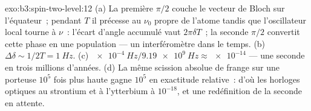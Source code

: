 \begin{solution}{exo:b3:spin-two-level:12}
(a) La première $\pi/2$ couche le vecteur de Bloch sur l'équateur~;
pendant $T$ il précesse au $\nu_0$ propre de l'atome tandis que
l'oscillateur local tourne à $\nu$~: l'écart d'angle accumulé vaut
$2\pi\delta T$~; la seconde $\pi/2$ convertit cette phase en une
population --- un interféromètre dans le temps. (b) $\Delta\delta \sim
1/2T = \qty{1}{Hz}$. (c) $\qty{e-4}{Hz}/\qty{9.19e9}{Hz} \approx
\num{e-14}$ --- une seconde en trois millions d'années. (d) La même
scission absolue de frange sur une porteuse $10^5$ fois plus haute
gagne $10^5$ en exactitude relative~: d'où les horloges optiques au
strontium et à l'ytterbium à $10^{-18}$, et une redéfinition de la
seconde en attente.
\end{solution}


